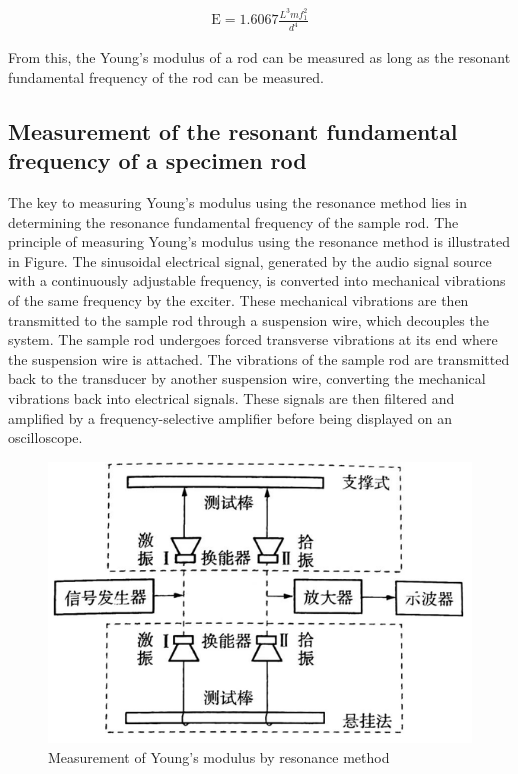 \documentclass[UTF8]{article}
\begin{document}
    \begin{eqnarray}
    \mathrm{E}=1.6067 \frac{L^3mf_{1}^2}{d^4}
    \end{eqnarray}
    
    From this, the Young's modulus of a rod can be measured as long as the resonant fundamental frequency of the rod can be measured.
    
   
   \subsection{Measurement of the resonant fundamental frequency of a specimen rod}
   The key to measuring Young's modulus using the resonance method lies in determining the resonance fundamental frequency of the sample rod. The principle of measuring Young's modulus using the resonance method is illustrated in Figure. The sinusoidal electrical signal, generated by the audio signal source with a continuously adjustable frequency, is converted into mechanical vibrations of the same frequency by the exciter. These mechanical vibrations are then transmitted to the sample rod through a suspension wire, which decouples the system. The sample rod undergoes forced transverse vibrations at its end where the suspension wire is attached. The vibrations of the sample rod are transmitted back to the transducer by another suspension wire, converting the mechanical vibrations back into electrical signals. These signals are then filtered and amplified by a frequency-selective amplifier before being displayed on an oscilloscope.
   
   \begin{figure}[H]
   	    	\centering
   	    	\includegraphics[clip,scale=1,trim={0 0 0 0}]{fig/fig5.png}
   	        \caption{Measurement of Young's modulus by resonance method}
   	        \label{figure.1}
       \end{figure}  
   
\end{document}
